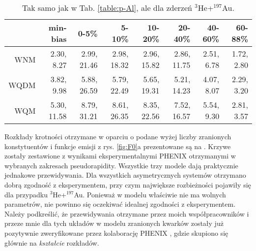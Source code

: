 \documentclass[a4paper,12pt]{article}
\begin{document}
\begin{table}[H]\centering
\begin{tabular}{|r|r|r|r|r|r|r|r|} \hline
 & min-bias & 0-5\% & 5-10\% & 10-20\% & 20-40\% & 40-60\% & 60-88\% \\ \hline
WNM  & 2.30, 8.27 & 2.99, 21.46 & 2.98, 18.32 & 2.96, 15.82 & 2.86, 11.75 & 2.51, 6.78 & 1.72, 2.80 \\ \hline
WQDM & 3.82, 9.98 & 5.88, 26.59 & 5.79, 22.49 & 5.65, 19.31 & 5.21, 14.23 & 4.07, 8.07 & 2.29, 3.20 \\ \hline
WQM  & 5.30, 11.58 & 8.79, 31.21 & 8.61, 26.35 & 8.35, 22.56 & 7.52, 16.57 & 5.54, 9.30 & 2.81, 3.57 \\ \hline
\end{tabular}
\caption{Tak samo jak w Tab. \ref{table:p-Al}, ale dla zderzeń $^3$He+$^{197}$Au.}\label{table:he-Au}
\end{table}

Rozkłady krotności otrzymane w oparciu o podane wyżej liczby zranionych konstytuentów i funkcje emisji z rys. \ref{fig:F0}a prezentowane są na . Krzywe zostały zestawione z wynikami eksperymentalnymi PHENIX otrzymanymi w wybranych zakresach pseudorapidity. Wszystkie trzy modele dają praktycznie jednakowe przewidywania. Dla wszystkich asymetrycznych systemów otrzymano dobrą zgodność z eksperymentem, przy czym największe rozbieżności pojawiły się dla przypadku $^3$He+$^{197}$Au. Ponieważ w modelu właściwie nie ma wolnych parametrów, nie powinno się oczekiwać idealnej zgodności z eksperymentem. Należy podkreślić, że przewidywania otrzymane przez moich współpracowników i przeze mnie dla tych układów w modelu zranionych kwarków zostały już pozytywnie zweryfikowane przez kolaborację PHENIX \cite{Adare:2018toe}, gdzie skupiono się głównie na \textit{kształcie} rozkładów.
\end{document}
